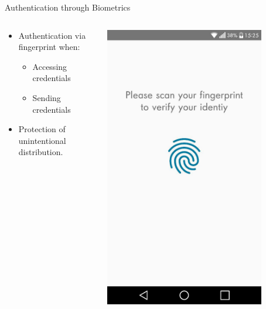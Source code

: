 \documentclass{beamer}
\begin{document}
\begin{frame}{Authentication through Biometrics}
\vspace{-10mm}
	\begin{columns}[onlytextwidth]
		\begin{column}{0.7\textwidth}
			\begin{itemize}
			\item Authentication via fingerprint when: 
			\begin{itemize}
				\item Accessing credentials
				\item Sending credentials
			\end{itemize}
			\item Protection of unintentional distribution.
			\end{itemize}
		\end{column}
		\begin{column}{0.3\textwidth}
			\begin{center}
			\includegraphics[width=0.8\textwidth]{images/AuthenticationScreenNew.jpg} \\

\end{center}
\end{column}
\end{columns}
\end{frame}
\end{document}
